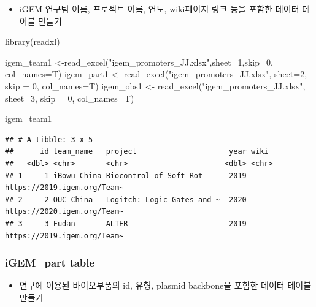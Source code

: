 \documentclass[
]{article}
\newenvironment{Shaded}{\begin{snugshade}}{\end{snugshade}}
\newcommand{\AttributeTok}[1]{\textcolor[rgb]{0.77,0.63,0.00}{#1}}
\newcommand{\DecValTok}[1]{\textcolor[rgb]{0.00,0.00,0.81}{#1}}
\newcommand{\FunctionTok}[1]{\textcolor[rgb]{0.00,0.00,0.00}{#1}}
\newcommand{\NormalTok}[1]{#1}
\newcommand{\OtherTok}[1]{\textcolor[rgb]{0.56,0.35,0.01}{#1}}
\newcommand{\StringTok}[1]{\textcolor[rgb]{0.31,0.60,0.02}{#1}}
\providecommand{\tightlist}{%
  \setlength{\itemsep}{0pt}\setlength{\parskip}{0pt}}
\begin{document}
\begin{itemize}
\tightlist
\item
  iGEM 연구팀 이름, 프로젝트 이름, 연도, wiki페이지 링크 등을 포함한
  데이터 테이블 만들기
\end{itemize}

\begin{Shaded}
\begin{Highlighting}[]
\FunctionTok{library}\NormalTok{(readxl)}

\NormalTok{igem\_team1 }\OtherTok{\textless{}{-}}\FunctionTok{read\_excel}\NormalTok{(}\StringTok{"igem\_promoters\_JJ.xlsx"}\NormalTok{,}\AttributeTok{sheet=}\DecValTok{1}\NormalTok{,}\AttributeTok{skip=}\DecValTok{0}\NormalTok{, }\AttributeTok{col\_names=}\NormalTok{T)}
\NormalTok{igem\_part1 }\OtherTok{\textless{}{-}} \FunctionTok{read\_excel}\NormalTok{(}\StringTok{"igem\_promoters\_JJ.xlsx"}\NormalTok{, }\AttributeTok{sheet=}\DecValTok{2}\NormalTok{, }\AttributeTok{skip =} \DecValTok{0}\NormalTok{, }\AttributeTok{col\_names=}\NormalTok{T)}
\NormalTok{igem\_obs1 }\OtherTok{\textless{}{-}} \FunctionTok{read\_excel}\NormalTok{(}\StringTok{"igem\_promoters\_JJ.xlsx"}\NormalTok{, }\AttributeTok{sheet=}\DecValTok{3}\NormalTok{, }\AttributeTok{skip =} \DecValTok{0}\NormalTok{, }\AttributeTok{col\_names=}\NormalTok{T)}

\NormalTok{igem\_team1}
\end{Highlighting}
\end{Shaded}

\begin{verbatim}
## # A tibble: 3 x 5
##      id team_name   project                     year wiki                       
##   <dbl> <chr>       <chr>                      <dbl> <chr>                      
## 1     1 iBowu-China Biocontrol of Soft Rot      2019 https://2019.igem.org/Team~
## 2     2 OUC-China   Logitch: Logic Gates and ~  2020 https://2020.igem.org/Team~
## 3     3 Fudan       ALTER                       2019 https://2019.igem.org/Team~
\end{verbatim}

\hypertarget{igem_part-table}{%
\subsubsection{iGEM\_part table}\label{igem_part-table}}

\begin{itemize}
\tightlist
\item
  연구에 이용된 바이오부품의 id, 유형, plasmid backbone을 포함한 데이터
  테이블 만들기
\end{itemize}
\end{document}
